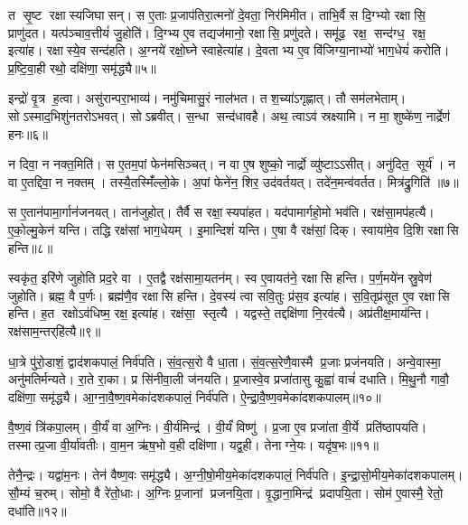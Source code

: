 त सृ॒ष्ट रक्षास्यजिघासन्।
स ए॒ताः प्र॒जाप॑तिरा॒त्मनो॑ दे॒वता॒ निर॑मिमीत।
ताभि॒र्वै स दि॒ग्भ्यो रक्षासि॒ प्राणु॑दत।
यत्प॑ञ्चाव॒त्तीयं॑ जु॒होति॑।
दि॒ग्भ्य ए॒व तद्यज॑मानो॒ रक्षासि॒ प्रणु॑दते।
समू॑ढ॒ रक्ष॒ सन्द॑ग्ध॒ रक्ष॒ इत्या॑ह।
रक्षास्ये॒व सन्द॑हति।
अ॒ग्नये॑ रक्षो॒घ्ने स्वाहेत्या॑ह।
दे॒वताभ्य ए॒व वि॑जिग्या॒नाभ्यो॑ भाग॒धेयं॑ करोति।
प्र॒ष्टि॒वा॒ही रथो॒ दक्षि॑णा॒ समृ॑द्ध्यै॥५॥

इन्द्रो॑ वृ॒त्र ह॒त्वा।
असु॑रान्परा॒भाव्य॑।
नमु॑चिमासु॒रं नाल॑भत।
तश॒च्या॑ऽगृह्णात्।
तौ सम॑लभेताम्।
सोऽस्माद॒भिशु॑नतरो\-ऽभवत्।
सोऽब्रवीत्।
स॒न्धा सन्द॑धावहै।
अथ॒ त्वाऽव॑ स्रक्ष्यामि।
न मा॒ शुष्के॑ण॒ नार्द्रेण॑ हनः॥६॥

न दिवा॒ न नक्त॒मिति॑।
स ए॒तम॒पां फेन॑मसिञ्चत्।
न वा ए॒ष शुष्को॒ नार्द्रो व्यु॑ष्टाऽऽसीत्।
अनु॑दित॒ सूर्य॑।
न वा ए॒तद्दिवा॒ न नक्तम्।
तस्यै॒तस्मिँ॑ल्लो॒के।
अ॒पां फेने॑न॒ शिर॒ उद॑वर्तयत्।
तदे॑न॒मन्व॑वर्तत।
मित्र॑द्रु॒गिति॑ ॥७॥

स ए॒तान॑पामा॒र्गान॑जनयत्।
तान॑जुहोत्।
तैर्वै स रक्षा॒स्यपा॑हत।
यद॑पामार्गहो॒मो भव॑ति।
रक्ष॑सा॒मप॑हत्यै।
ए॒को॒ल्मु॒केन॑ यन्ति।
तद्धि रक्ष॑सां भाग॒धेयम्।
इ॒मान्दिशं॑ यन्ति।
ए॒षा वै रक्ष॑सां॒ दिक्।
स्वाया॑मे॒व दि॒शि रक्षासि हन्ति॥८॥

स्वकृ॑त॒ इरि॑णे जुहोति प्रद॒रे वा।
ए॒तद्वै रक्ष॑सामा॒यतन॑म्।
स्व ए॒वायत॑ने॒ रक्षासि हन्ति।
प॒र्ण॒मये॑न स्रु॒वेण॑ जुहोति।
ब्रह्म॒ वै प॒र्णः।
ब्रह्म॑णै॒व रक्षासि हन्ति।
दे॒वस्य॑ त्वा सवि॒तुः प्र॑स॒व इत्या॑ह।
स॒वि॒तृप्र॑सूत ए॒व रक्षासि हन्ति।
ह॒त रक्षोऽव॑धिष्म॒ रक्ष॒ इत्या॑ह।
रक्ष॑सा॒ स्तृत्यै।
यद्वस्ते॒ तद्दक्षि॑णा नि॒रव॑त्यै।
अप्र॑तीक्ष॒माय॑न्ति।
रक्ष॑साम॒न्तर्‌हि॑त्यै॥९॥\anuvakamend[य॒च्छ॒ति॒ वरु॑णं॒ तृती॑यं॒ विजि॑त्या असृजत॒ समृ॑द्ध्यै हनो॒ मित्र॑द्रु॒गिति॑ हन्ति॒ स्तृत्यै॒ त्रीणि॑ च]

धा॒त्रे पु॑रो॒डाशं॒ द्वाद॑शकपालं॒ निर्व॑पति।
सं॒व॒त्स॒रो वै धा॒ता।
सं॒व॒त्स॒रेणै॒वास्मै प्र॒जाः प्रज॑नयति।
अन्वे॒वास्मा॒ अनु॑मतिर्मन्यते।
रा॒ते रा॒का।
प्र सि॑नीवा॒ली ज॑नयति।
प्र॒जास्वे॒व प्रजा॑तासु कु॒ह्वा॑ वाचं॑ दधाति।
मि॒थु॒नौ गावौ॒ दक्षि॑णा॒ समृ॑द्ध्यै।
आ॒ग्ना॒वै॒ष्ण॒वमेका॑दशकपालं॒ निर्व॑पति।
ऐ॒न्द्रा॒वै॒ष्ण॒वमेका॑दशकपालम्॥१०॥

वै॒ष्ण॒वं त्रि॑कपा॒लम्।
वी॒र्यं॑ वा अ॒ग्निः।
वी॒र्य॑मिन्द्र॑।
वी॒र्यं॑ विष्णु॑।
प्र॒जा ए॒व प्रजा॑ता वी॒र्ये प्रति॑ष्ठापयति।
तस्मात्प्र॒जा वी॒र्या॑वतीः।
वा॒म॒न ऋ॑ष॒भो व॒ही दक्षि॑णा।
यद्व॒ही।
तेनाग्ने॒यः।
यदृ॑ष॒भः॥११॥

तेनै॒न्द्रः।
यद्वा॑म॒नः।
तेन॑ वैष्ण॒वः समृ॑द्ध्यै।
अ॒ग्नी॒षो॒मीय॒मेका॑\-दशकपालं॒ निर्व॑पति।
इ॒न्द्रा॒सो॒मीय॒मेका॑दशकपालम्।
सौ॒म्यं च॒रुम्।
सोमो॒ वै रे॑तो॒धाः।
अ॒ग्निः प्र॒जानां प्रजनयि॒ता।
वृ॒द्धाना॒मिन्द्र॑ प्रदापयि॒ता।
सोम॑ ए॒वास्मै॒ रेतो॒ दधा॑ति॥१२॥

